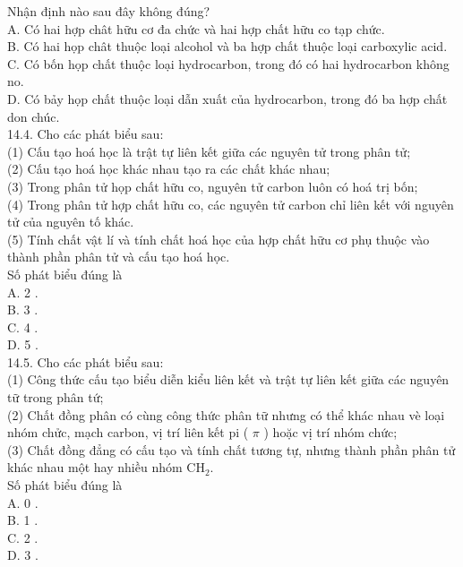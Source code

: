 \documentclass[10pt]{article}
\begin{document}
Nhận định nào sau đây không đúng?\\
A. Có hai hợp chât hữu cơ đa chức và hai hợp chất hữu co tạp chức.\\
B. Có hai họp chât thuộc loại alcohol và ba hợp chất thuộc loại carboxylic acid.\\
C. Có bốn họp chất thuộc loại hydrocarbon, trong đó có hai hydrocarbon không no.\\
D. Có bảy họp chất thuộc loại dẫn xuất của hydrocarbon, trong đó ba hợp chất don chúc.\\
14.4. Cho các phát biểu sau:\\
(1) Cấu tạo hoá học là trật tự liên kết giữa các nguyên tử trong phân tử;\\
(2) Cấu tạo hoá học khác nhau tạo ra các chất khác nhau;\\
(3) Trong phân tử họp chất hữu co, nguyên tử carbon luôn có hoá trị bốn;\\
(4) Trong phân tử hợp chất hữu co, các nguyên tử carbon chỉ liên kết với nguyên tử của nguyên tố khác.\\
(5) Tính chất vật lí và tính chất hoá học của hợp chất hữu cơ phụ thuộc vào thành phần phân tử và cấu tạo hoá học.\\
Số phát biểu đúng là\\
A. 2 .\\
B. 3 .\\
C. 4 .\\
D. 5 .\\
14.5. Cho các phát biểu sau:\\
(1) Công thức cấu tạo biểu diễn kiểu liên kết và trật tự liên kết giữa các nguyên tữ trong phân tứ;\\
(2) Chất đồng phân có cùng công thức phân tữ nhưng có thể khác nhau vè loại nhóm chửc, mạch carbon, vị trí liên kết pi ( $\pi$ ) hoặc vị trí nhóm chức;\\
(3) Chất đồng đẳng có cấu tạo và tính chất tương tự, nhưng thành phần phân tử khác nhau một hay nhiều nhóm $\mathrm{CH}_{2}$.\\
Số phát biểu đúng là\\
A. 0 .\\
B. 1 .\\
C. 2 .\\
D. 3 .
\end{document}
